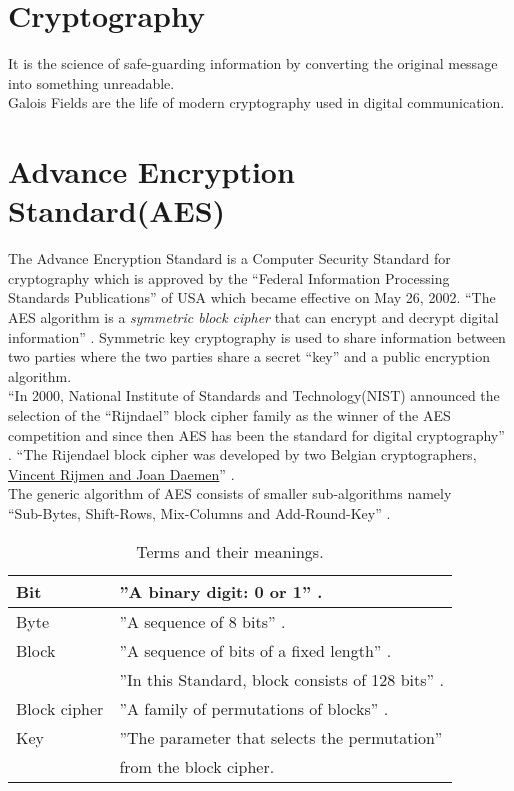 \section{Cryptography}
It is the science of safe-guarding information by converting the original message into something unreadable.\\
Galois Fields are the life of modern cryptography used in digital communication.

\section{Advance Encryption Standard(AES)}
The Advance Encryption Standard is a Computer Security Standard for cryptography which is approved by the ``Federal Information Processing Standards Publications'' of USA which became effective on May 26, 2002. ``The AES algorithm is a \textit{symmetric block cipher} that can encrypt and decrypt digital information'' \cite{aes}. Symmetric key cryptography is used to share information between two parties where the two parties share a secret ``key'' and a public encryption algorithm.\\

``In 2000, National Institute of Standards and Technology(NIST) announced the selection of the ``Rijndael'' block cipher family as the winner of the AES competition and since then AES has been the standard for digital cryptography'' \cite{aes}. ``The Rijendael block cipher was developed by two Belgian cryptographers, \underline{Vincent Rijmen and Joan Daemen}'' \cite{aes}.\\

The generic algorithm of AES consists of smaller sub-algorithms namely\\ ``Sub-Bytes, Shift-Rows, Mix-Columns and Add-Round-Key'' \cite{aes}.

\begin{table}[h!]
  \centering
\begin{tabular}{|l|l|}
  \hline
  Bit & \hspace{7mm}''A binary digit: 0 or 1'' \cite{aes}.\\
    \hline
  Byte & \hspace{7mm}''A sequence of 8 bits'' \cite{aes}.\\
    \hline
  Block & \hspace{7mm}''A sequence of bits of a fixed length'' \cite{aes}.\\
  \ & \hspace{13mm}''In this Standard, block consists of 128 bits'' \cite{aes}.\\
    \hline
  Block cipher &  \hspace{7mm}''A family of permutations of blocks'' \cite{aes}.\\
    \hline
  Key & \hspace{7mm}''The parameter that selects the permutation'' \cite{aes} \\
  \ & \hspace{13mm}from the block cipher.\\
    \hline
\end{tabular}
\caption{\small Terms and their meanings.}
\end{table}


